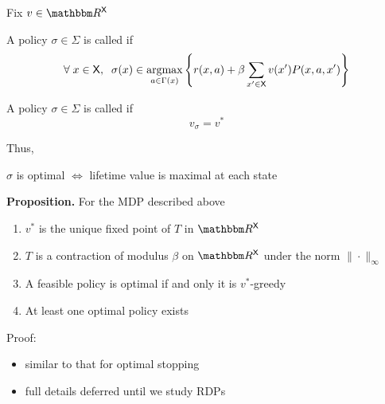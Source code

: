 \begin{frame}
    
    Fix $v \in \RR^\Xsf$

    \vspace{0.5em}
    A policy $\sigma \in \Sigma$ is called  if
    \begin{equation*}
        \forall \; x \in \Xsf, \;\;
        \sigma(x)
        \in \argmax_{a \in \Gamma(x)}
        \left\{
            r(x, a)
            + \beta
            \sum_{x' \in \Xsf} v(x') P(x, a, x')
        \right\}
    \end{equation*}

    \vspace{0.5em}
    A policy $\sigma \in \Sigma$ is called  if
    \begin{equation*}
        v_\sigma = v^*
    \end{equation*}

    Thus,
    \begin{center}
        $\sigma$ is optimal $\iff$ lifetime value is maximal at each state  
    \end{center}


\end{frame}

\begin{frame}
    
    {\bf Proposition.} For the MDP described above
    \begin{enumerate}
        \item $v^*$ is the unique fixed point of $T$
            in $\RR^\Xsf$
    \vspace{0.5em}
        \item $T$ is a contraction of modulus $\beta$ on $\RR^\Xsf$ under the
            norm $\| \cdot \|_\infty$ 
    \vspace{0.5em}
        \item A feasible policy is optimal if and only it is
            $v^*$-greedy
    \vspace{0.5em}
        \item At least one optimal policy exists
    \end{enumerate}


    \vspace{0.5em}
    \vspace{0.5em}
    Proof: 
    \begin{itemize}
        \item similar to that for optimal stopping
    \vspace{0.5em}
        \item full details deferred until we study RDPs
    \end{itemize}


\end{frame}













